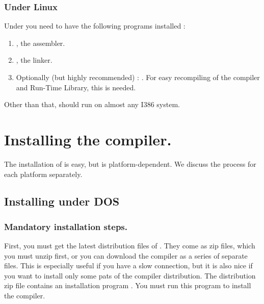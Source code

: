 \documentclass{report}
\begin{document}
\subsubsection{Under Linux}
Under \linux you need to have the following programs installed :
\begin{enumerate}
\item \gnu {}, the \gnu assembler.
\item \gnu {}, the \gnu linker.
\item Optionally (but highly recommended) : \gnu {}. For easy
recompiling of the compiler and Run-Time Library, this is needed.
\end{enumerate}
Other than that, \fpc should run on almost any I386 \linux system.

\section{Installing the compiler.}
The installation of \fpc is easy, but is platform-dependent.
We discuss the process for each platform separately.

\subsection{Installing under DOS}
\subsubsection{Mandatory installation steps.}
First, you must get the latest distribution files of \fpc. They come as zip
files, which you must unzip first, or you can download the compiler as a
series of separate files. This is especially useful if you have a slow 
connection, but it is also nice if you want to install only some pats of the
compiler distribution.  The distribution zip file contains an
installation program . You must run this program to install
the compiler. 

\end{document}
